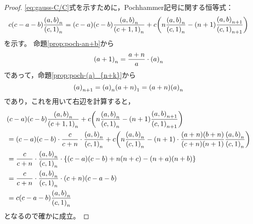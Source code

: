 \documentclass[a4paper,draft]{ltjsarticle}
\begin{document}
\begin{thm}[Kummerの関係]
\begin{proof}
        \eqref{eq:gauss-C/C}式を示すために，Pochhammer記号に関する恒等式：
        \begin{equation}
            c\pare{c-a-b}\frac{\poch{a,b}{n}}{\poch{c,1}{n}}
            =\pare{c-a}\pare{c-b}\frac{\poch{a,b}{n}}{\poch{c+1,1}{n}}
            +c\pare{
                n\frac{\poch{a,b}{n}}{\poch{c,1}{n}}
                -\pare{n+1}\frac{\poch{a,b}{n+1}}{\poch{c,1}{n+1}}
            }
            \label{eq:gauss-pochの恒等式}
        \end{equation}
        を示す。
        命題\ref{prop:poch-an+b}から
        \begin{equation}
            \poch{a+1}{n}=\frac{a+n}{a}\cdot \poch{a}{n}
        \end{equation}
        であって，命題\ref{prop:poch-(a)_{n+k}}から
        \begin{equation}
            \poch{a}{n+1}=\poch{a}{n}\poch{a+n}{1}=\pare{a+n}\poch{a}{n}
        \end{equation}
        であり，これを用いて右辺を計算すると，
        \begin{align}
            &\pare{c-a}\pare{c-b}\frac{\poch{a,b}{n}}{\poch{c+1,1}{n}}
            +c\pare{
                n\frac{\poch{a,b}{n}}{\poch{c,1}{n}}
                -\pare{n+1}\frac{\poch{a,b}{n+1}}{\poch{c,1}{n+1}}
            }
            \\
            &=\pare{c-a}\pare{c-b}\cdot \frac{c}{c+n}\cdot \frac{\poch{a,b}{n}}{\poch{c,1}{n}}
            +c\pare{
                n\frac{\poch{a,b}{n}}{\poch{c,1}{n}}
                -\pare{n+1}\cdot \frac{\pare{a+n}\pare{b+n}}{\pare{c+n}\pare{n+1}}\frac{\poch{a,b}{n}}{\poch{c,1}{n}}
            }
            \\
            &=\frac{c}{c+n}\cdot \frac{\poch{a,b}{n}}{\poch{c,1}{n}}\cdot
            \bra{
                \pare{c-a}\pare{c-b}+n\pare{n+c}-\pare{n+a}\pare{n+b}
            }
            \\
            &=\frac{c}{c+n}\cdot \frac{\poch{a,b}{n}}{\poch{c,1}{n}}
            \cdot \pare{c+n}\pare{c-a-b}
            \\
            &=c\pare{c-a-b}\frac{\poch{a,b}{n}}{\poch{c,1}{n}}
        \end{align}
        となるので確かに成立。


\end{proof}
\end{thm}
\end{document}
